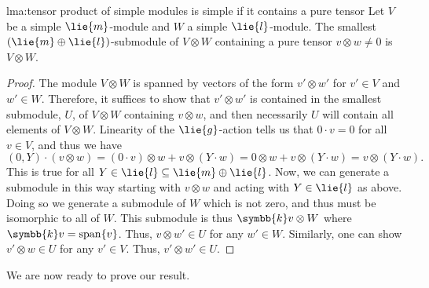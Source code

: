 \documentclass[fleqn]{NotesClass}
\renewcommand{\field}{\symbb{k}}
\DeclareMathOperator{\Span}{span}
\begin{document}
    \begin{lma}{}{lma:tensor product of simple modules is simple if it contains a pure tensor}
        Let \(V\) be a simple \(\lie{m}\)-module and \(W\) a simple \(\lie{l}\)-module.
        The smallest \((\lie{m} \oplus \lie{l})\)-submodule of \(V \otimes W\) containing a pure tensor \(v \otimes w \ne 0\) is \(V \otimes W\).
        \begin{proof}
            The module \(V \otimes W\) is spanned by vectors of the form \(v' \otimes w'\) for \(v' \in V\) and \(w' \in W\).
            Therefore, it suffices to show that \(v' \otimes w'\) is contained in the smallest submodule, \(U\), of \(V \otimes W\) containing \(v \otimes w\), and then necessarily \(U\) will contain all elements of \(V \otimes W\).
            Linearity of the \(\lie{g}\)-action tells us that \(0 \cdot v = 0\) for all \(v \in V\), and thus we have
            \begin{equation}
                (0, Y) \cdot (v \otimes w) = (0 \cdot v) \otimes w + v \otimes (Y \cdot w) = 0 \otimes w + v \otimes (Y \cdot w) = v \otimes (Y \cdot w).
            \end{equation}
            This is true for all \(Y \in \lie{l} \subseteq \lie{m} \oplus \lie{l}\).
            Now, we can generate a submodule in this way starting with \(v \otimes w\) and acting with \(Y \in \lie{l}\) as above.
            Doing so we generate a submodule of \(W\) which is not zero, and thus must be isomorphic to all of \(W\).
            This submodule is thus \(\field v \otimes W\) where \(\field v = \Span\{v\}\).
            Thus, \(v \otimes w' \in U\) for any \(w' \in W\).
            Similarly, one can show \(v' \otimes w \in U\) for any \(v' \in V\).
            Thus, \(v' \otimes w' \in U\).
        \end{proof}
    \end{lma}
    
    We are now ready to prove our result.
    
\end{document}
